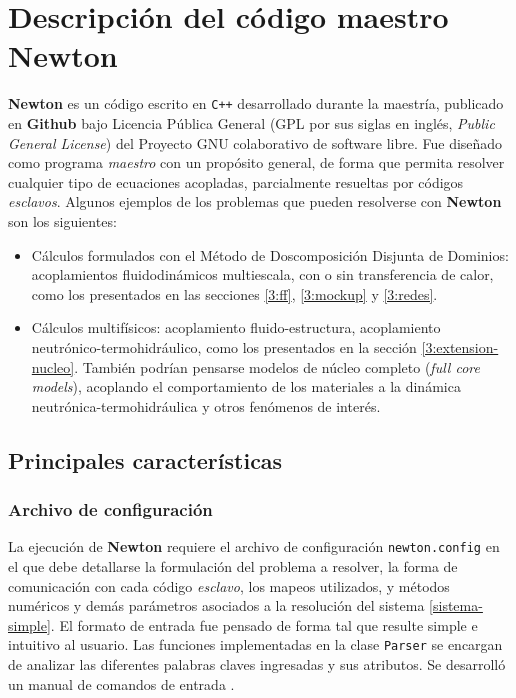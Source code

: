 \chapter{Descripción del código maestro \textbf{Newton}}
\label{C:newton}

\textbf{Newton} es un código escrito en \texttt{C++} desarrollado durante la maestría,
publicado en \textbf{Github} \cite{github} bajo Licencia Pública General (GPL por sus siglas en inglés, \textit{Public General License}) del Proyecto GNU colaborativo de software libre.
Fue diseñado como programa \textit{maestro} con un propósito general, de forma que permita resolver cualquier tipo de ecuaciones acopladas,
parcialmente resueltas por códigos \textit{esclavos}.
Algunos ejemplos de los problemas que pueden resolverse con \textbf{Newton} son los siguientes:
\begin{itemize}
\item Cálculos formulados con el Método de Doscomposición Disjunta de Dominios: 
acoplamientos fluidodinámicos multiescala, con o sin transferencia de calor, como los presentados en las secciones \ref{3:ff}, \ref{3:mockup} y \ref{3:redes}.
\item Cálculos multifísicos: acoplamiento fluido-estructura, acoplamiento neutrónico-termohidráulico, como los presentados en la sección \ref{3:extension-nucleo}.
También podrían pensarse modelos de núcleo completo (\textit{full core models}), acoplando el comportamiento de los materiales a la dinámica neutrónica-termohidráulica y otros fenómenos de interés.
\end{itemize}

\section{Principales características}
\label{ap2:main-features}

\subsection*{Archivo de configuración}
\label{ap2:parser}

La ejecución de \textbf{Newton} requiere el archivo de configuración \texttt{newton.config} en el que debe detallarse la formulación del problema a resolver,
la forma de comunicación con cada código \textit{esclavo}, los mapeos utilizados, y métodos numéricos y demás parámetros asociados a la resolución del sistema \ref{sistema-simple}.
El formato de entrada fue pensado de forma tal que resulte simple e intuitivo al usuario.
Las funciones implementadas en la clase \texttt{Parser} se encargan de analizar las diferentes palabras claves ingresadas y sus atributos.
Se desarrolló un manual de comandos de entrada \cite{newton-user-manual}.

